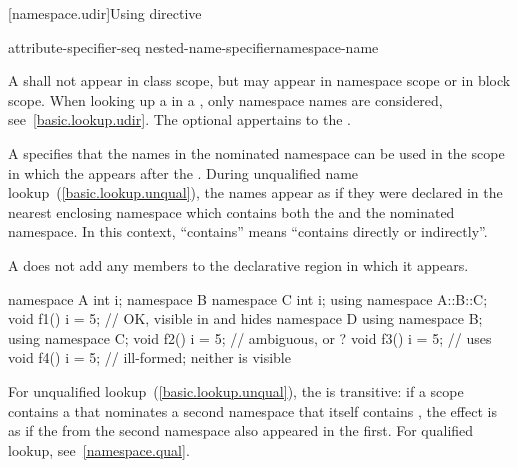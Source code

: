 [namespace.udir]{Using directive}%

\begin{bnf}
\br
    attribute-specifier-seq\opt {} nested-name-specifier\opt namespace-name \terminal{;}
\end{bnf}

\pnum
A  shall not appear in class scope, but may
appear in namespace scope or in block scope.
\enternote
When looking up a  in a
, only namespace names are considered,
see~\ref{basic.lookup.udir}.
\exitnote
The optional  appertains to the .

\pnum
A  specifies that the names in the nominated
namespace can be used in the scope in which the
 appears after the .
During unqualified name lookup~(\ref{basic.lookup.unqual}), the names
appear as if they were declared in the nearest enclosing namespace which
contains both the  and the nominated
namespace.
\enternote
In this context, ``contains'' means ``contains directly or indirectly''.
\exitnote

\pnum
A  does not add any members to the declarative
region in which it appears.
\enterexample

\begin{codeblock}
namespace A {
  int i;
  namespace B {
    namespace C {
      int i;
    }
    using namespace A::B::C;
    void f1() {
      i = 5;        // OK,  visible in  and hides 
    }
  }
  namespace D {
    using namespace B;
    using namespace C;
    void f2() {
      i = 5;        // ambiguous,  or ?
    }
  }
  void f3() {
    i = 5;          // uses 
  }
}
void f4() {
  i = 5;            // ill-formed; neither  is visible
}
\end{codeblock}
\exitexample

\pnum
For unqualified lookup~(\ref{basic.lookup.unqual}), the
 is transitive: if a scope contains a
 that nominates a second namespace that itself
contains , the effect is as if the
 from the second namespace also appeared in
the first.
\enternote For qualified lookup, see~\ref{namespace.qual}. \exitnote
\enterexample

